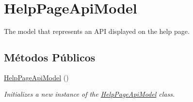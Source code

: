 \hypertarget{classApi3Layers_1_1Areas_1_1HelpPage_1_1Models_1_1HelpPageApiModel}{}\section{Help\+Page\+Api\+Model}
\label{classApi3Layers_1_1Areas_1_1HelpPage_1_1Models_1_1HelpPageApiModel}


The model that represents an A\+PI displayed on the help page.  


\subsection*{Métodos Públicos}
\begin{DoxyCompactItemize}
\item 
\hyperlink{classApi3Layers_1_1Areas_1_1HelpPage_1_1Models_1_1HelpPageApiModel_a0743b6d8422d1b857b2bfccee21d846c}{Help\+Page\+Api\+Model} ()
\begin{DoxyCompactList}\small\item\em Initializes a new instance of the \hyperlink{classApi3Layers_1_1Areas_1_1HelpPage_1_1Models_1_1HelpPageApiModel}{Help\+Page\+Api\+Model} class. \end{DoxyCompactList}\end{DoxyCompactItemize}
